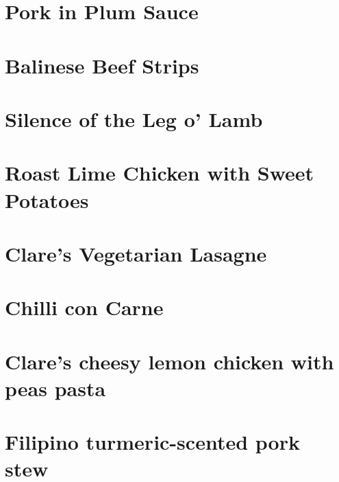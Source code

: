   \section{Pork in Plum Sauce}
  \section{Balinese Beef Strips}
  \section{Silence of the Leg o' Lamb}
  \section{Roast Lime Chicken with Sweet Potatoes}
  \section{Clare's Vegetarian Lasagne}
  \section{Chilli con Carne}
  \section{Clare's cheesy lemon chicken with peas pasta}
  \section{Filipino turmeric-scented pork stew}
  \clearpage